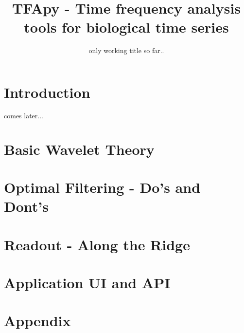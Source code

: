 \documentclass[notitlepage]{scrartcl}
\begin{document}
\title{TFApy - Time frequency analysis tools for biological time series}
\subtitle{only working title so far..}

\maketitle
\section{Introduction}

comes later...

\section{Basic Wavelet Theory}


\section{Optimal Filtering - Do's and Dont's}

\section{Readout - Along the Ridge}

\section{Application UI and API}

\section{Appendix}



\end{document}
